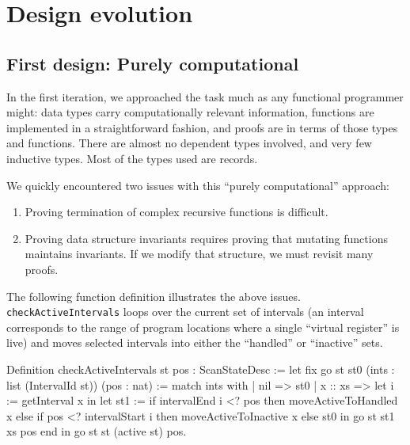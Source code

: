 \documentclass{llncs}
\newenvironment{MyCoqExampleStar}{\small \verbatim}{\endverbatim \normalsize}
\begin{document}
\section{Design evolution}
\label{sec:evolve}

\subsection{First design: Purely computational}
\label{sec:compdesign}

In the first iteration, we approached the task much as any functional
programmer might: data types carry computationally relevant
information, functions are implemented in a straightforward fashion,
and proofs are in terms of those types and functions.  There are
almost no dependent types involved, and very few inductive types.
Most of the types used are records.


We quickly encountered two issues with this ``purely computational''
approach:
\begin{enumerate}
\item Proving termination of complex recursive functions is difficult.
\item Proving data structure invariants requires proving that mutating
  functions maintains invariants. If we modify that structure, we must revisit
  many proofs.
\end{enumerate}
The following function definition illustrates the above
issues. \texttt{checkActiveIntervals} loops over the current set of
intervals (an interval corresponds to the range of program locations
where a single ``virtual register'' is live) and moves selected
intervals into either the ``handled'' or ``inactive'' sets.

\begin{MyCoqExampleStar}
Definition checkActiveIntervals st pos : ScanStateDesc :=
  let fix go st st0 (ints : list (IntervalId st)) (pos : nat) :=
    match ints with
    | nil => st0
    | x :: xs =>
        let i := getInterval x in
        let st1 := if intervalEnd i <? pos
                   then moveActiveToHandled x
                   else if pos <? intervalStart i
                        then moveActiveToInactive x
                        else st0 in
        go st st1 xs pos
    end in
  go st st (active st) pos.
\end{MyCoqExampleStar}
\end{document}
